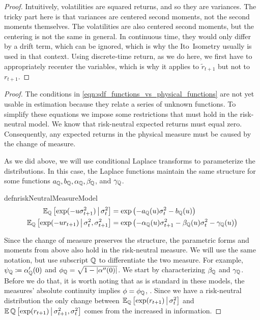 \documentclass[11pt, letterpaper, twoside, final]{article}
\begin{document}
\begin{appendices}
\begin{proof}
Intuitively, volatilities are squared returns, and so they are variances.
The tricky part here is that variances are centered second moments, not the second moments themselves.
The volatilities are also centered second moments, but the centering is not the same in general.
In continuous time, they would only differ by a drift term, which can be ignored, which is why the Ito\ Isometry
usually is used in that context.
Using discrete-time return, as we do here, we first have to appropriately recenter the variables, which is why it
applies to $\widetilde{r}_{t+1}$ but not to $r_{t+1}$.

\end{proof}



\physicalMeasureFunctions*

\begin{proof}

The conditions in \cref{eqn:sdf_functions_vs_physical_functions} are not yet usable in estimation because they
relate a series of unknown functions.
To simplify these equations we impose some restrictions that must hold in the risk-neutral model. 
We know that risk-neutral expected returns must equal zero.
Consequently, any expected returns in the physical measure must be caused by the change of measure.

As we did above, we will use conditional Laplace transforms to parameterize the distributions.
In this case, the Laplace functions maintain the same structure for some functions $a_{\QQ}, b_{\QQ},
\alpha_{\QQ}, \beta_{\QQ}$, and $\gamma_{\QQ}$.

\begin{restatable}{defn}{riskNeutralMeasureModel}
    \label{defn:risk_neutral_model}
    \begin{align}
        \E_{\QQ} \left[\exp(-u \sigma^2_{t+1}) \mvert \sigma^2_t \right] &= \exp\left( - a_{\QQ}(u) \sigma^2_t -
        b_{\QQ}(u) \right) \\
        \E_{\QQ}\left[\exp(-u r_{t+1}) \mvert \sigma^2_t,  \sigma^2_{t+1}\right] &= \exp\left(- \alpha_{\QQ}(u)
        \sigma^2_{t+1} - \beta_{\QQ}(u)\sigma^2_t - \gamma_{\QQ}(u) \right) 
    \end{align}
\end{restatable}


Since the change of measure preserves the structure, the parametric forms and moments from above also hold in the
risk-neutral measure.
We will use the same notation, but use subscript $\QQ$ to differentiate the two measure. 
For example, $\psi_{\QQ} \coloneqq \alpha_{\QQ}'(0)$ and $\phi_{\QQ} = \sqrt{1 - \abs*{\alpha''(0)}}$.
We start by characterizing $\beta_{\QQ}$ and $\gamma_{\QQ}$.
Before we do that, it is worth noting that as is standard in these models, the measures' absolute continuity
implies $\phi = \phi_{\QQ}$, \parencite[17]{khrapov2016affine}.
Since we have a risk-neutral distribution the only change between $\E_{\QQ}\left[\exp(r_{t+1}) \mvert
\sigma^2_t\right]$ and $\E{\QQ}\left[\exp(r_{t+1}) \mvert \sigma^2_{t+1}, \sigma^2_t\right]$ comes from the
increased in information.


\end{proof}
\end{appendices}
\end{document}
